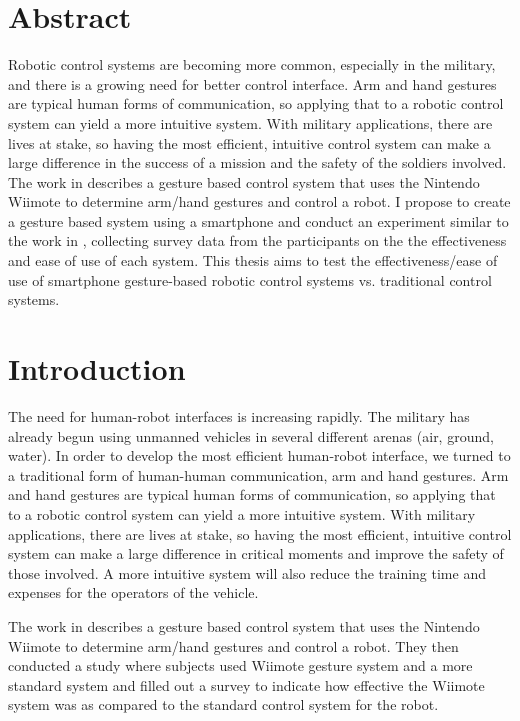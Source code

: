 \documentclass[12pt, letterpaper]{report}
\begin{document}
\chapter*{Abstract}
Robotic control systems are becoming more common, especially in the military, and there is a growing need for better control interface. Arm and hand gestures are typical human forms of communication, so applying that to a robotic control system can yield a more intuitive system. With military applications, there are lives at stake, so having the most efficient, intuitive control system can make a large difference in the success of a mission and the safety of the soldiers involved. 
The work in \cite{Varcholik_Barber_Nicholson_2008} describes a gesture based control system that uses the Nintendo Wiimote to determine arm/hand gestures and control a robot. I propose to create a gesture based system using a smartphone and conduct an experiment similar to the work in \cite{Varcholik_Barber_Nicholson_2008}, collecting survey data from the participants on the the effectiveness and ease of use of each system. This thesis aims to test the effectiveness/ease of use of smartphone gesture-based robotic control systems vs. traditional control systems.

\chapter{Introduction}
\setcounter{page}{1}

The need for human-robot interfaces is increasing rapidly. The military has already begun using unmanned vehicles in several different arenas (air, ground, water). In order to develop the most efficient human-robot interface, we turned to a traditional form of human-human communication, arm and hand gestures. Arm and hand gestures are typical human forms of communication, so applying that to a robotic control system can yield a more intuitive system. With military applications, there are lives at stake, so having the most efficient, intuitive control system can make a large difference in critical moments and improve the safety of those involved. A more intuitive system will also reduce the training time and expenses for the operators of the vehicle.

The work in \cite{Varcholik_Barber_Nicholson_2008} describes a gesture based control system that uses the Nintendo Wiimote to determine arm/hand gestures and control a robot. They then conducted a study where subjects used Wiimote gesture system and a more standard system and filled out a survey to indicate how effective the Wiimote system was as compared to the standard control system for the robot.
\end{document}
